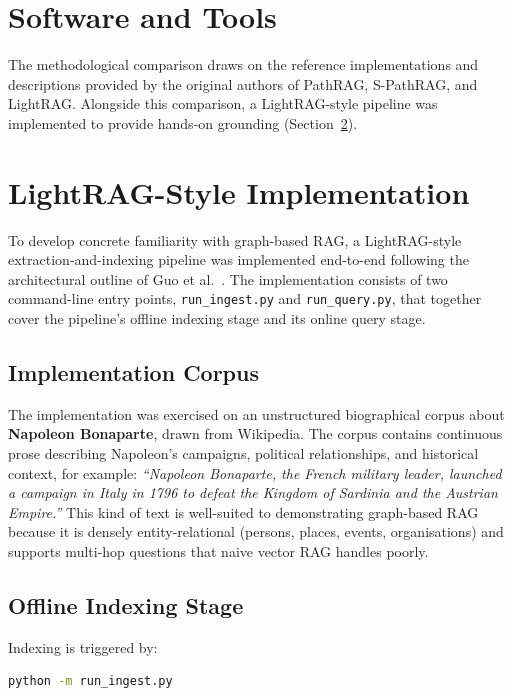 \documentclass[12pt,a4paper,oneside]{report}
\begin{document}
\section{Software and Tools}

The methodological comparison draws on the reference implementations and
descriptions provided by the original authors of PathRAG, S-PathRAG, and
LightRAG. Alongside this comparison, a LightRAG-style pipeline was
implemented to provide hands-on grounding
(Section~\ref{sec:implementation}).

\section{LightRAG-Style Implementation}
\label{sec:implementation}

To develop concrete familiarity with graph-based RAG, a LightRAG-style
extraction-and-indexing pipeline was implemented end-to-end following
the architectural outline of Guo et al.~\citep{guo2025lightrag}. The implementation
consists of two command-line entry points, \texttt{run\_ingest.py}
and \texttt{run\_query.py}, that together cover the pipeline's
offline indexing stage and its online query stage.

\subsection{Implementation Corpus}

The implementation was exercised on an unstructured biographical corpus
about \textbf{Napoleon Bonaparte}, drawn from Wikipedia. The corpus
contains continuous prose describing Napoleon's campaigns, political
relationships, and historical context, for example: \emph{``Napoleon
Bonaparte, the French military leader, launched a campaign in Italy in
1796 to defeat the Kingdom of Sardinia and the Austrian Empire.''} This
kind of text is well-suited to demonstrating graph-based RAG because it
is densely entity-relational (persons, places, events, organisations)
and supports multi-hop questions that naive vector RAG handles poorly.

\subsection{Offline Indexing Stage}

Indexing is triggered by:
\begin{lstlisting}[language=bash]
python -m run_ingest.py
\end{lstlisting}
\end{document}
